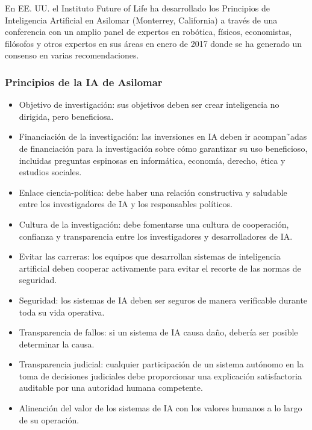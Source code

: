 \documentclass[10pt]{article}
\begin{document}
        
En EE. UU. el Instituto Future of Life ha desarrollado los Principios de Inteligencia Artiﬁcial en Asilomar (Monterrey, California) a través de una conferencia con un amplio panel de expertos en robótica, físicos, economistas, ﬁlósofos y otros expertos en sus áreas en enero de 2017 donde se ha generado un consenso en varias recomendaciones.
        
        \subsubsection{Principios de la IA de Asilomar}
        
        \begin{itemize}
                    
            \item Objetivo de investigación: sus objetivos deben ser crear inteligencia no dirigida, pero beneﬁciosa.
            \item Financiación de la investigación: las inversiones en IA deben ir acompan˜adas de ﬁnanciación para la investigación sobre cómo garantizar su uso beneﬁcioso, incluidas preguntas espinosas en informática, economía, derecho, ética y estudios sociales.
            \item Enlace ciencia-política: debe haber una relación constructiva y saludable entre los investigadores de IA y los responsables políticos.
            \item Cultura de la investigación: debe fomentarse una cultura de cooperación, conﬁanza y transparencia entre los investigadores y desarrolladores de IA.
            \item Evitar las carreras: los equipos que desarrollan sistemas de inteligencia artiﬁcial deben cooperar activamente para evitar el recorte de las normas de seguridad.
            \item Seguridad: los sistemas de IA deben ser seguros de manera veriﬁcable durante toda su vida operativa.
            \item Transparencia de fallos: si un sistema de IA causa daño, debería ser posible determinar la causa.
            \item Transparencia judicial: cualquier participación de un sistema autónomo en la toma de decisiones judiciales debe proporcionar una explicación satisfactoria auditable por una autoridad humana competente.
            \item Alineación del valor de los sistemas de IA con los valores humanos a lo largo de su operación.

\end{itemize}
\end{document}

